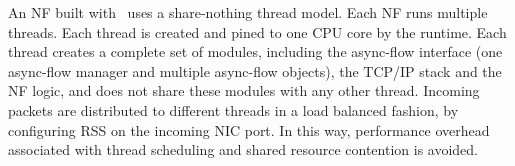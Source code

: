 
An NF built with \netstar~uses a share-nothing thread model. %
Each NF runs multiple threads. Each thread is created and pined to one CPU core by the runtime. Each thread creates a complete set of modules, including the async-flow interface (one async-flow manager and multiple async-flow objects), the TCP/IP stack and the NF logic, and does not share these modules with any other thread. Incoming packets are distributed to different threads in a load balanced fashion, by configuring RSS \cite{rss} on the incoming NIC port. In this way, performance overhead associated with thread scheduling and shared resource contention is avoided. %
